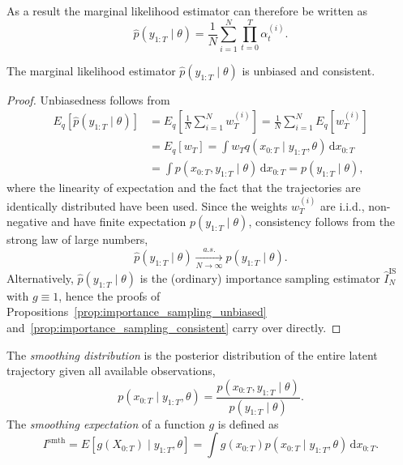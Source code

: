As a result the marginal likelihood estimator can therefore be written as
\begin{equation}
    \hat{p}(y_{1:T}\mid\theta) = \frac{1}{N} \sum_{i=1}^{N} \prod_{t=0}^{T} \alpha_t^{(i)}.
\end{equation}

\begin{proposition}
    \label{prop:marginal_likelihood_estimator_unbiased_consistent}
    The marginal likelihood estimator $\hat{p}(y_{1:T}\mid\theta)$ is unbiased and consistent.
\end{proposition}
\begin{proof}
    Unbiasedness follows from
    \begin{align}
        E_q[\hat{p}(y_{1:T}\mid\theta)] &= E_q\left[\frac{1}{N} \sum_{i=1}^{N} w_T^{(i)}\right] = \frac{1}{N} \sum_{i=1}^{N} E_q[w_T^{(i)}] \\
        &= E_q[w_T] = \int w_T q(x_{0:T}\mid y_{1:T},\theta)\,\mathrm{d}x_{0:T} \\
        &= \int p(x_{0:T},y_{1:T}\mid\theta)\,\mathrm{d}x_{0:T} = p(y_{1:T}\mid\theta),
    \end{align}
    where the linearity of expectation and the fact that the trajectories are identically distributed have been used.
    Since the weights $w_T^{(i)}$ are i.i.d., non-negative and have finite expectation $p(y_{1:T}\mid\theta)$, consistency follows from the strong law of large numbers,
    \begin{equation}
        \hat{p}(y_{1:T}\mid\theta) \xrightarrow[N\to\infty]{a.s.} p(y_{1:T}\mid\theta).
    \end{equation}
    Alternatively, $\hat{p}(y_{1:T}\mid\theta)$ is the (ordinary) importance sampling estimator $\hat{I}_N^{\mathrm{IS}}$ with $g\equiv 1$, hence the proofs of Propositions~\ref{prop:importance_sampling_unbiased} and~\ref{prop:importance_sampling_consistent} carry over directly.
\end{proof}

\begin{definition}
    The \emph{smoothing distribution} is the posterior distribution of the entire latent trajectory given all available observations,
    \begin{equation}
        p(x_{0:T}\mid y_{1:T},\theta) = \frac{p(x_{0:T},y_{1:T}\mid\theta)}{p(y_{1:T}\mid\theta)}.
    \end{equation}
    The \emph{smoothing expectation} of a function $g$ is defined as
    \begin{equation}
        I^{\mathrm{smth}} = E\left[g(X_{0:T}) \mid y_{1:T},\theta\right] = \int g(x_{0:T}) p(x_{0:T}\mid y_{1:T},\theta)\,\mathrm{d}x_{0:T}.
    \end{equation}
\end{definition}

